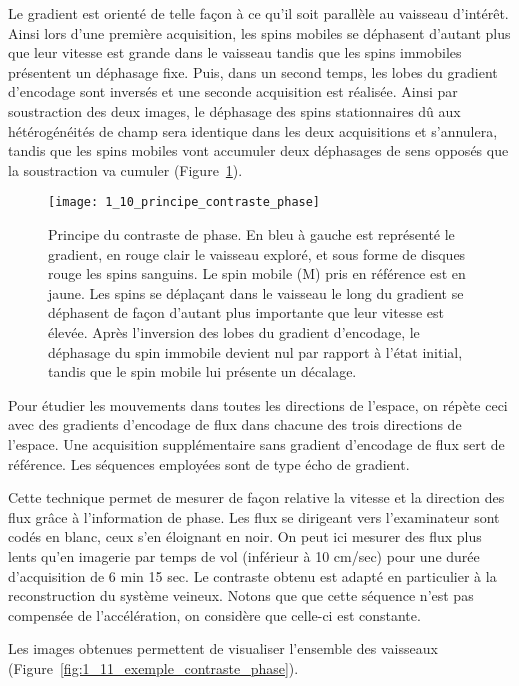 Le gradient est orienté de telle façon à ce qu’il soit parallèle au vaisseau d’intérêt. Ainsi lors d’une première acquisition, les spins mobiles se déphasent d’autant plus que leur vitesse est grande dans le vaisseau tandis que les spins immobiles présentent un déphasage fixe. Puis, dans un second temps, les lobes du gradient d’encodage sont inversés et une seconde acquisition est réalisée. Ainsi par soustraction des deux images, le déphasage des spins stationnaires dû aux hétérogénéités de champ sera identique dans les deux acquisitions et s’annulera, tandis que les spins mobiles vont accumuler deux déphasages de sens opposés que la soustraction va cumuler (Figure~\ref{fig:1_10_principe_contraste_phase}).

\begin{figure}[!t]
\centering
\texttt{[image: 1\_10\_principe\_contraste\_phase]}
\caption{Principe du contraste de phase. En bleu à gauche est représenté le gradient, en rouge clair le vaisseau exploré, et sous forme de disques rouge les spins sanguins. Le spin mobile (M) pris en référence est en jaune. Les spins se déplaçant dans le vaisseau le long du gradient se déphasent de façon d’autant plus importante que leur vitesse est élevée. Après l’inversion des lobes du gradient d’encodage, le déphasage du spin immobile devient nul par rapport à l’état initial, tandis que le spin mobile lui présente un décalage. }
\label{fig:1_10_principe_contraste_phase}	
\end{figure}
Pour étudier les mouvements dans toutes les directions de l’espace, on répète ceci avec des gradients d’encodage de flux dans chacune des trois directions de l’espace. Une acquisition supplémentaire sans gradient d’encodage de flux sert de référence. Les séquences employées sont de type écho de gradient.

Cette technique permet de mesurer de façon relative la vitesse et la direction des flux grâce à l’information de phase. Les flux se dirigeant vers l’examinateur sont codés en blanc, ceux s’en éloignant en noir. On peut ici mesurer des flux plus lents qu’en imagerie par temps de vol (inférieur à 10 cm/sec) pour une durée d'acquisition de 6 min 15 sec. Le contraste obtenu est adapté en particulier à la reconstruction du système veineux. Notons que que cette séquence n'est pas compensée de l'accélération, on considère que celle-ci est constante.

Les images obtenues permettent de visualiser l’ensemble des vaisseaux (Figure~\ref{fig:1_11_exemple_contraste_phase}).

